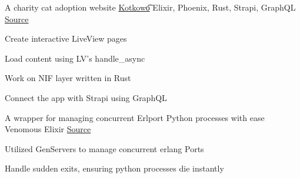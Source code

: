 

\begin{cventries}

  \vspace{-2.25mm}
  \cventry
    { A charity cat adoption website } %
    {\href{https://kotkowo.ravensiris.xyz}{{Kotkowo}\t{\faLink\acvHeaderIconSep}}} %
    {Elixir, Phoenix, Rust, Strapi, GraphQL} %
    {\href{https://github.com/kotkowo/kotkowo}{\faGithubSquare\acvHeaderIconSep Source}} %
    {
      \begin{cvitems} %
        \item {Create interactive LiveView pages}
        \item {Load content using LV's handle\_async}
        \item {Work on NIF layer written in Rust}
        \item {Connect the app with Strapi using GraphQL}
      \end{cvitems}
    } %
\cventry
    {A wrapper for managing concurrent Erlport Python processes with ease} %
    {Venomous} %
    {Elixir} %
    {\href{https://github.com/rustysnek/venomous}{\faGithubSquare\acvHeaderIconSep Source}} %
    {
      \begin{cvitems} %
        \item {Utilized GenServers to manage concurrent erlang Ports}
        \item {Handle sudden exits, ensuring python processes die instantly}
      \end{cvitems}
    }


\end{cventries}
